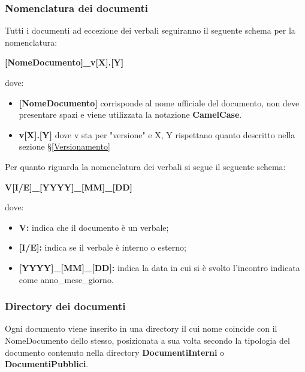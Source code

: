 \subsubsection{Nomenclatura dei documenti} \label{NomenclaturaDoc}
Tutti i documenti ad eccezione dei verbali seguiranno il seguente schema per la nomenclatura:
\begin{center}
	\textbf{[NomeDocumento]\_v[X].[Y]}
\end{center}
dove:
\begin{itemize}
	\item \textbf{[NomeDocumento]} corrisponde al nome ufficiale del documento, non deve presentare spazi e viene utilizzata la notazione \textbf{CamelCase}.
	\item \textbf{v[X].[Y]} dove v sta per "versione" e X, Y rispettano quanto descritto nella sezione \S\ref{Versionamento}
\end{itemize}
Per quanto riguarda la nomenclatura dei verbali si segue il seguente schema:
\begin{center}
	\textbf{V[I/E]\_[YYYY]\_[MM]\_[DD]}
\end{center}
dove:
\begin{itemize}
	\item \textbf{V:} indica che il documento è un verbale;
	\item \textbf{[I/E]:} indica se il verbale è interno o esterno;
	\item \textbf{[YYYY]\_[MM]\_[DD]:} indica la data in cui si è svolto l'incontro indicata come anno\_mese\_giorno.
\end{itemize}

\subsubsection{Directory dei documenti}
Ogni documento viene inserito in una directory il cui nome coincide con il NomeDocumento dello stesso, posizionata a sua volta secondo la tipologia del documento contenuto nella directory \textbf{DocumentiInterni} o \textbf{DocumentiPubblici}.


